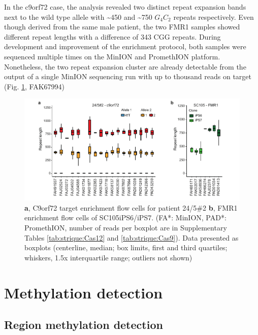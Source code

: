 In the c9orf72 case, the analysis revealed two distinct repeat expansion bands next to the wild type allele with \textasciitilde450 and \textasciitilde750 $ G_{4}C_{2} $ repeats respectively. Even though derived from the same male patient, the two FMR1 samples showed different repeat lengths with a difference of 343 CGG repeats. During development and improvement of the enrichment protocol, both samples were sequenced multiple times on the MinION and PromethION platform. Nonetheless, the two repeat expansion cluster are already detectable from the output of a single MinION sequencing run with up to thousand reads on target (Fig. \ref{fig:strique:count_experiments}, FAK67994)

\begin{figure}[h]
    \centering
    \includegraphics[width=1.0\textwidth]{figures/strique/count_experiments.pdf}
    \captionsetup{format=plain}
    \caption[Repeat count cluster stability over experiments]{\textbf{a}, C9orf72 target enrichment flow cells for patient 24/5\#2 \textbf{b}, FMR1 enrichment flow cells of SC105iPS6/iPS7. (FA*: MinION, PAD*: PromethION, number of reads per boxplot are in Supplementary Tables \ref{tab:strique:Cas12} and \ref{tab:strique:Cas9}). Data presented as boxplots (centerline, median; box limits, first and third quartiles; whiskers, 1.5x interquartile range; outliers not shown)}
    \label{fig:strique:count_experiments}
\end{figure}




\section{Methylation detection}
\label{sec:strique:modifications}


\subsection{Region methylation detection}
\label{subsec:strique:modifications_region}

